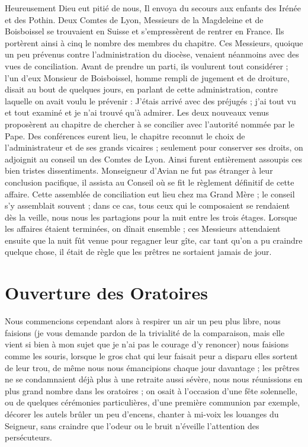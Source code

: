\documentclass[11pt,a4paper]{report}
\begin{document}
Heureusement Dieu eut pitié de nous, Il envoya du secours aux enfants des Irénée et des Pothin. Deux Comtes de Lyon, Messieurs de la Magdeleine et de Boisboissel se trouvaient en Suisse et s'empressèrent de rentrer en France. Ils portèrent ainsi à cinq le nombre des membres du chapitre. Ces Messieurs, quoique un peu prévenus contre l'administration du diocèse, venaient néanmoins avec des vues de conciliation. Avant de prendre un parti, ils voulurent tout considérer ; l'un d'eux Monsieur de Boisboissel, homme rempli de jugement et de droiture, disait au bout de quelques jours, en parlant de cette administration, contre laquelle on avait voulu le prévenir : J'étais arrivé avec des préjugés ; j'ai tout vu et tout examiné et je n'ai trouvé qu'à admirer. Les deux nouveaux venus proposèrent au chapitre de chercher à se concilier avec l'autorité nommée par le Pape. Des conférences eurent lieu, le chapitre reconnut le choix de l'administrateur et de ses grands vicaires ; seulement pour conserver ses droits, on adjoignit au conseil un des Comtes de Lyon. Ainsi furent entièrement assoupis ces bien tristes dissentiments. Monseigneur d'Avian ne fut pas étranger à leur conclusion pacifique, il assista au Conseil où se fit le règlement définitif de cette affaire. Cette assemblée de conciliation eut lieu chez ma Grand Mère ; le conseil s'y assemblait souvent ; dans ce cas, tous ceux qui le composaient se rendaient dès la veille, nous nous les partagions pour la nuit entre les trois étages. Lorsque les affaires étaient terminées, on dînait ensemble ; ces Messieurs attendaient ensuite que la nuit fût venue pour regagner leur gîte, car tant qu'on a pu craindre quelque chose, il était de règle que les prêtres ne sortaient jamais de jour.

\section*{Ouverture des Oratoires}

Nous commencions cependant alors à respirer un air un peu plus libre, nous faisions (je vous demande pardon de la trivialité de la comparaison, mais elle vient si bien à mon sujet que je n'ai pas le courage d'y renoncer) nous faisions comme les souris, lorsque le gros chat qui leur faisait peur a disparu elles sortent de leur trou, de même nous nous émancipions chaque jour davantage ; les prêtres ne se condamnaient déjà plus à une retraite aussi sévère, nous nous réunissions en plus grand nombre dans les oratoires ; on osait à l'occasion d'une fête solennelle, ou de quelques cérémonies particulières, d'une première communion par exemple, décorer les autels brûler un peu d'encens, chanter à mi-voix les louanges du Seigneur, sans craindre que l'odeur ou le bruit n'éveille l'attention des persécuteurs.
\end{document}
